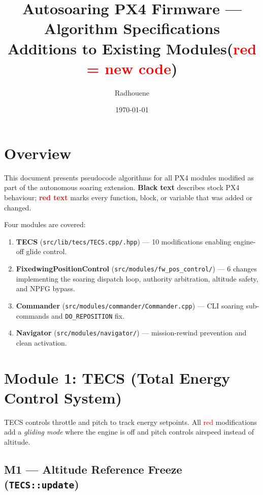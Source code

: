 \documentclass[11pt,a4paper]{article}
\title{\textbf{Autosoaring PX4 Firmware — Algorithm Specifications}\\
       \large Additions to Existing Modules\quad(\textcolor{red}{red = new code})}
\author{Radhouene}
\date{\today}
\begin{document}
\maketitle
\tableofcontents
\newpage

\section{Overview}

This document presents pseudocode algorithms for all PX4 modules modified as
part of the autonomous soaring extension.  \textbf{Black text} describes
stock PX4 behaviour; \textcolor{red}{\textbf{red text}} marks every function,
block, or variable that was added or changed.

Four modules are covered:
\begin{enumerate}
  \item \textbf{TECS} (\texttt{src/lib/tecs/TECS.cpp/.hpp}) — 10 modifications
        enabling engine-off glide control.
  \item \textbf{FixedwingPositionControl} (\texttt{src/modules/fw\_pos\_control/}) —
        6 changes implementing the soaring dispatch loop, authority arbitration,
        altitude safety, and NPFG bypass.
  \item \textbf{Commander} (\texttt{src/modules/commander/Commander.cpp}) — CLI
        soaring sub-commands and \texttt{DO\_REPOSITION} fix.
  \item \textbf{Navigator} (\texttt{src/modules/navigator/}) — mission-rewind
        prevention and clean activation.
\end{enumerate}

\section{Module 1: TECS (Total Energy Control System)}

TECS controls throttle and pitch to track energy setpoints.  All
\textcolor{red}{red} modifications add a \emph{gliding mode} where the engine
is off and pitch controls airspeed instead of altitude.

\subsection{M1 --- Altitude Reference Freeze (\texttt{TECS::update})}
\end{document}
